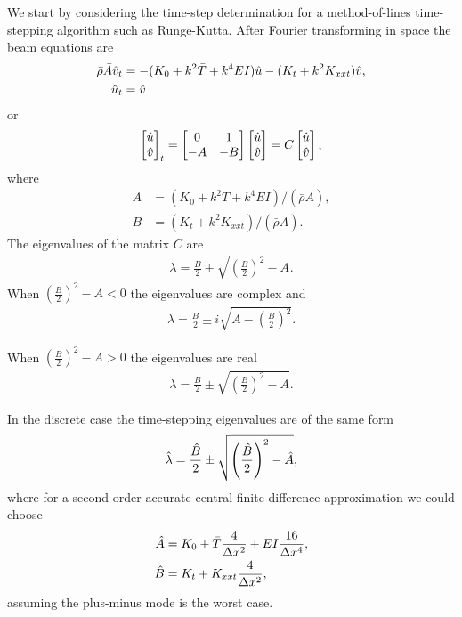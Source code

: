 \documentclass[11pt]{article}
\newcommand{\rhos}{\bar{\rho}}
\newcommand{\As}{\bar{A}}
\newcommand{\Ts}{\bar{T}}
\begin{document}
We start by considering the time-step determination for a method-of-lines time-stepping
algorithm such as Runge-Kutta.
After Fourier transforming in space the beam equations are
\begin{align*}
 \rhos\As \vHat_{t} &= - (K_0 + k^2\Ts + k^4 E I )\uHat - (K_t+ k^2 K_{xxt}) \vHat, \\
  \uHat_t &= \vHat
\end{align*}
or
\begin{align*}
 \begin{bmatrix} \hat{u}\\ \hat{v} \end{bmatrix}_t = 
      \begin{bmatrix}
            0 & 1 \\
           -A & -B
      \end{bmatrix}
 \begin{bmatrix} \hat{u}\\ \hat{v}\end{bmatrix}     = C \begin{bmatrix} \hat{u}\\ \hat{v}\end{bmatrix} , 
\end{align*}
where
\begin{align*}
  A &= (K_0 + k^2\Ts + k^4 E I)/(\rhos\As), \\
  B &= (K_t+ k^2 K_{xxt})/(\rhos\As). 
\end{align*}
The eigenvalues of the matrix $C$ are 
\begin{align*}
  \lambda = \frac{B}{2} \pm \sqrt{ \left(\frac{B}{2}\right)^2 - A} .
\end{align*}
 When $\left(\frac{B}{2}\right)^2 - A <0$ the eigenvalues are complex and
\begin{align*}
  \lambda = \frac{B}{2} \pm i \sqrt{ A - \left(\frac{B}{2}\right)^2} .
\end{align*}

 When $\left(\frac{B}{2}\right)^2 - A >0$ the eigenvalues are real
\begin{align*}
  \lambda = \frac{B}{2} \pm \sqrt{ \left(\frac{B}{2}\right)^2 - A}.
\end{align*}

In the discrete case the time-stepping eigenvalues are of the same form
\begin{align*}
  \hat{\lambda} = \frac{\hat{B}}{2} \pm \sqrt{ \left(\frac{\hat{B}}{2}\right)^2 - \hat{A}} ,
\end{align*}
where for a second-order accurate central finite difference approximation we could choose
\begin{align*}
  \Ahat &= K_0 + \Ts\frac{4}{\dx^2} + E I\frac{16}{\dx^4}, \\
  \Bhat &= K_t+ K_{xxt}\frac{4}{\dx^2} ,
\end{align*}
assuming the plus-minus mode is the worst case.
\end{document}
